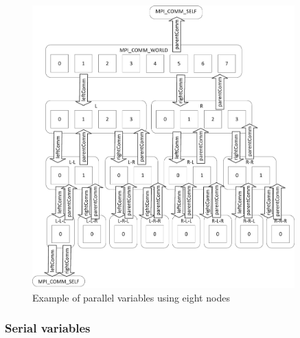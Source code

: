 \documentclass{article}
\begin{document}
\begin{figure}
\includegraphics[width=0.9\textwidth]{images/communicators.png}
\caption{Example of parallel variables using eight nodes}
\end{figure}


%
%

\subsubsection{Serial variables}
\end{document}
